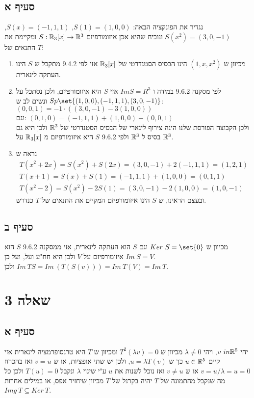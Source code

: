 \documentclass{article}
\DeclarePairedDelimiter\set\{\}
\begin{document}
	\subsection*{סעיף א}
	נגדיר את הפונקציה הבאה: $S(1) = (1,0,0)$, $S(x)=(-1,1,1)$, $S(x^2) = (3,0,-1)$ ונוכיח שהיא אכן איזומורפיזם $S: \mathbb{R}_3[x] \to \mathbb{R}^3$ ומקיימת את התנאים של $T$:
	\begin{enumerate}
		\item מכיוון ש $(1, x, x^2)$ הינו הבסיס הסטנדרטי של $\mathbb{R}_3[x]$ אזי לפי 9.4.2 מתקבל ש $S$ הינו העתקה לינארית.
		\item לפי מסקנה 9.6.2 במידה ו $Im S = R^3$ אזי $S$ היא איזומורפיזם, ולכן נסתכל על $Sp\set{(1,0,0), (-1,1,1), (3,0,-1)}$
		 ונשים לב ש: \\
		 $(0,0,1) = -1 \cdot ((3,0,-1)-3(1,0,0))$ \\
		 וגם: $(0,1,0) = (-1,1,1) + (1,0,0) - (0,0,1)$ \\
		  ולכן הקבוצה הפורסת שלנו הינה צירוף לינארי של הבסיס הסטנדרטי של $\mathbb{R}^3$ ולכן היא גם בסיס ל $\mathbb{R}^3$ ולפי 9.6.2 $S$ היא איזומורפיזם מ $\mathbb{R}_3[x]$ על $\mathbb{R}^3$.
		 \item נראה ש
		 \begin{align*}
			T(x^2 + 2x) = S(x^2) + S(2x) = (3,0,-1) + 2(-1,1,1) = (1, 2, 1) \\
			T(x+1) = S(x) + S(1) = (-1,1,1) + (1,0,0) = (0,1,1) \\
			T(x^2 - 2) = S(x^2) -2S(1) = (3,0,-1) - 2(1,0,0) = (1,0,-1)
		 \end{align*}
		 ובעצם הראינו, ש $S$ הינו איזומורפיזם המקיים את התנאים של $T$ כנדרש.
	\end{enumerate}

	\subsection*{סעיף ב}
		מכיוון ש $Ker \ S = \set{0}$ וגם $S$ הוא העתקה לינארית, אזי ממסקנה 9.6.2 $S$ הוא איזומורפיזם על $V$ ולכן היא חח"ע ועל, ועל כן $Im \ S = V$. \\
		ולכן $Im \ TS = Im \ (T(S(v))) = Im \ T(V) = Im \ T$.

	\pagebreak
	\section*{שאלה 3}
	\subsection*{סעיף א}
	יהי $v \ in \mathbb{R}^5$, ויהי $\lambda \neq 0$ מכיוון ש $T^2(\lambda v) = 0$ ומכיוון ש $T$ היא טרנסופרמציה לינארית אזי קיים $u \in \mathbb{R}^5$
	כך ש $u = \lambda T(v)$, ולכן יש שתי אופציות, או ש $v = u$ ואז בהכרח $v = u/\lambda = u = 0$
	או ש $v \neq u$ ואז נוכל לשנות את $u$ ע"י שינוי $\lambda$ ונקבל $T(u) = 0$ ולכן כל מה שנקבל מהתמונה של $T$ יהיה בקרנל של $T$ מכיוון שיחזיר אפס, או במילים אחרות $Img \ T \subseteq Ker \ T$.
\end{document}
